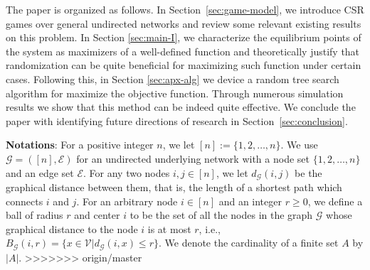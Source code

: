The paper is organized as follows. In Section~\ref{sec:game-model}, we introduce CSR games over general undirected networks and review some relevant existing results on this problem. In Section \ref{sec:main-I}, we  characterize the equilibrium points of the system as maximizers of a well-defined function and theoretically justify that randomization can be quite beneficial for maximizing such function under certain cases. Following this, in Section \ref{sec:apx-alg} we device a random tree search algorithm for maximize the objective function. Through numerous simulation results we show that this method can be indeed quite effective. We conclude the paper with identifying future directions of research in Section~\ref{sec:conclusion}. 

\textbf{Notations}: 
For a positive integer $n$, we let $[n]:=\{1,2,\ldots,n\}$. We use $\mathcal{G}=([n], \mathcal{E})$ for an undirected underlying network with a node set $\{1,2,\ldots,n\}$ and an edge set $\mathcal{E}$. For any two nodes $i, j \in [n]$, we let $d_{\mathcal{G}}(i,j)$ be the graphical distance between them, that is, the length of a shortest path which connects $i$ and $j$. For an arbitrary node $i\in [n]$ and an integer $r\ge 0$, we define a ball of radius $r$ and center $i$ to be the set of all the nodes in the graph $\mathcal{G}$ whose graphical distance to the node $i$ is at most $r$, i.e., $B_{\mathcal{G}}(i,r)=\{x\in \mathcal{V}| d_{\mathcal{G}}(i,x)\leq r\}$. We denote the cardinality of a finite set $A$ by $|A|$.
>>>>>>> origin/master

